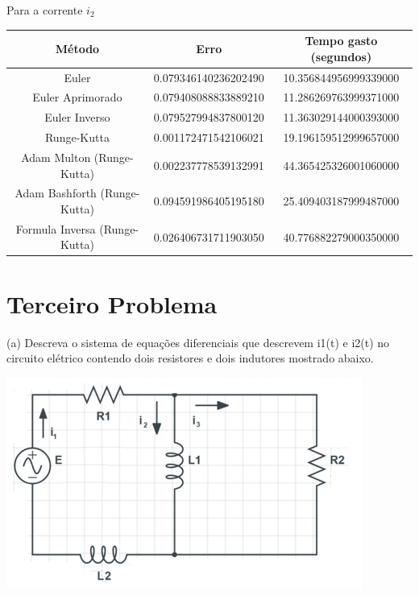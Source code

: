 \documentclass[12pt]{article}%
\newcommand{\newpara}
    {
    \vskip 0.5cm
    }
\begin{document}
    \newpara
    Para a corrente \(i_{2}\)
    \begin{center}
    \begin{tabular}{ |c| |c| |c| }
    \hline
    \textbf{Método}               & \textbf{Erro}        & \textbf{Tempo gasto (segundos)} \\ \hline
    Euler                         & 0.079346140236202490 & 10.356844956999339000           \\ \hline
    Euler Aprimorado              & 0.079408088833889210 & 11.286269763999371000           \\ \hline
    Euler Inverso                 & 0.079527994837800120 & 11.363029144000393000           \\ \hline
    Runge-Kutta                   & 0.001172471542106021 & 19.196159512999657000           \\ \hline
    Adam Multon     (Runge-Kutta) & 0.002237778539132991 & 44.365425326001060000           \\ \hline
    Adam Bashforth (Runge-Kutta)  & 0.094591986405195180 & 25.409403187999487000           \\ \hline
    Formula Inversa (Runge-Kutta) & 0.026406731711903050 & 40.776882279000350000           \\ \hline
    \end{tabular}
    \end{center}
    
\newpage
\section{Terceiro Problema}
    (a) Descreva o sistema de equações diferenciais que descrevem i1(t) e i2(t) no circuito elétrico contendo dois resistores e dois indutores mostrado abaixo.

    \begin{center}
        \includegraphics[scale=1.0]{problemas/p3a.png}
    \end{center}\
    
\end{document}
